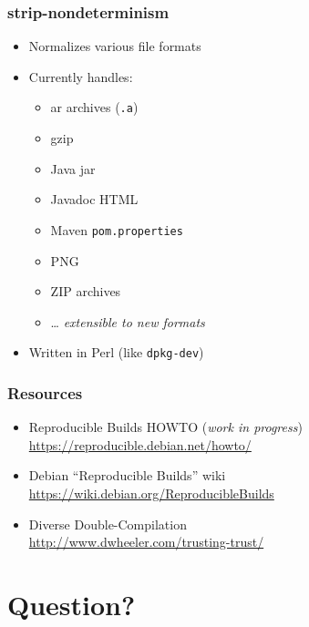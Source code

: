 \documentclass[14pt,aspectratio=169]{beamer}
\begin{document}
\begin{frame}
 \frametitle{strip-nondeterminism}

 \begin{itemize}
  \item Normalizes various file formats
  \item Currently handles:
   \begin{itemize}
    \item ar archives (\texttt{.a})
    \item gzip
    \item Java jar
    \item Javadoc HTML
    \item Maven \texttt{pom.properties}
    \item PNG
    \item ZIP archives
    \item … \textit{extensible to new formats}
   \end{itemize}
  \item Written in Perl (like \texttt{dpkg-dev})
 \end{itemize}
\end{frame}

\begin{frame}
 \frametitle{Resources}

 \begin{itemize}
  \item Reproducible Builds HOWTO (\textit{work in progress})\\
   \url{https://reproducible.debian.net/howto/}
  \item<2-> Debian “Reproducible Builds” wiki \\
   \url{https://wiki.debian.org/ReproducibleBuilds}
  \item<3> Diverse Double-Compilation \\
   \url{http://www.dwheeler.com/trusting-trust/}
 \end{itemize}
\end{frame}

\section{Question?}
\end{document}
